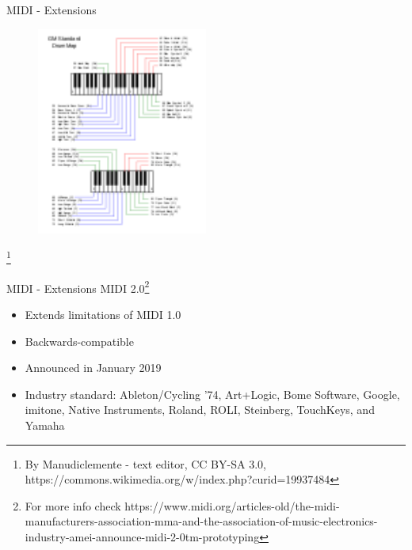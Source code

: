 \documentclass{beamer}
\newcommand\blfootnote[1]{%
  \begingroup
  \renewcommand\thefootnote{}\footnote{#1}%
  \addtocounter{footnote}{-1}%
  \endgroup
}
\begin{document}
\begin{frame}{MIDI - Extensions}
    \begin{figure}[h]
        \includegraphics[width=0.5\textwidth]{119px-GM_Standard_Drum_Map_on_the_keyboard.png}
    \end{figure}
    \blfootnote{By Manudiclemente - text editor, CC BY-SA 3.0, https://commons.wikimedia.org/w/index.php?curid=19937484}
\end{frame}

\begin{frame}{MIDI - Extensions}
    MIDI 2.0\footnote{For more info check https://www.midi.org/articles-old/the-midi-manufacturers-association-mma-and-the-association-of-music-electronics-industry-amei-announce-midi-2-0tm-prototyping}\\
    \vspace{5mm}
    \begin{itemize}
        \item Extends limitations of MIDI 1.0
        \item Backwards-compatible
        \item Announced in January 2019
        \item Industry standard: Ableton/Cycling '74, Art+Logic, Bome Software, Google, imitone, Native Instruments, Roland, ROLI, Steinberg, TouchKeys, and Yamaha
    \end{itemize}
\end{frame}
\end{document}
